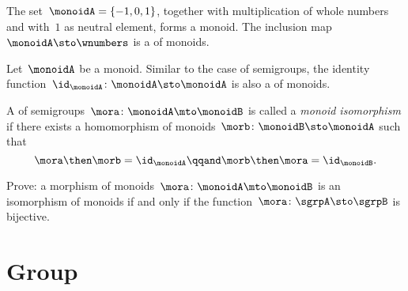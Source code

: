 \begin{example}
  The set~$\monoidA = \{ -1, 0, 1 \}$, together with multiplication of whole numbers and with~$1$ as neutral element, forms a monoid. The inclusion map~$\monoidA \sto \wnumbers$ is a \whomo of monoids.
\end{example}



\begin{definition}
  \label{def:identity-mon-mor}
  Let~$\monoidA$ be a monoid. Similar to the case of semigroups, the identity function~$\id_\monoidA\colon \monoidA \sto \monoidA$ is also a \whomo of monoids.
\end{definition}



\begin{definition}
  \label{def:monoid-iso}
  A \whomo of semigroups~$\mora\colon \monoidA \mto \monoidB$ is called a \emph{monoid isomorphism} if there exists a homomorphism of monoids~$\morb\colon \monoidB \sto \monoidA$ such that
  \begin{equation}
    \mora \then \morb = \id_\monoidA \qqand \morb \then \mora = \id_\monoidB.
  \end{equation}
\end{definition}


\begin{exercise}
  Prove: a morphism of monoids~$\mora\colon \monoidA \mto \monoidB$ is an isomorphism of monoids if and only if the function~$\mora\colon \sgrpA \sto \sgrpB$ is bijective.
\end{exercise}
\begin{solution}
\end{solution}


\section{Group \whomo}





